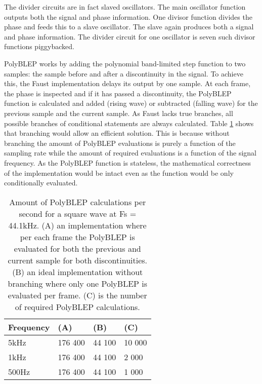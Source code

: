 \documentclass[11pt,a4paper]{article}
\begin{document}
The divider circuits are in fact slaved oscillators. The main oscillator function outputs both the signal and phase information. One divisor function divides the phase and feeds this to a slave oscillator. The slave again produces both a signal and phase information. The divider circuit for one oscillator is seven such divisor functions piggybacked.

PolyBLEP works by adding the polynomial band-limited step function to two samples: the sample before and after a discontinuity in the signal. To achieve this, the Faust implementation delays its output by one sample. At each frame, the phase is inspected and if it has passed a discontinuity, the PolyBLEP function is calculated and added (rising wave) or subtracted (falling wave) for the previous sample and the current sample. As Faust lacks true branches, all possible branches of conditional statements are always calculated. Table \ref{table:polyblep-amount} shows that branching would allow an efficient solution. This is because without branching the amount of PolyBLEP evaluations is purely a function of the sampling rate while the amount of required evaluations is a function of the signal frequency. As the PolyBLEP function is stateless, the mathematical correctness of the implementation would be intact even as the function would be only conditionally evaluated.

\begin{table}[h]
 \begin{center}
\begin{tabular}{|l|l|l|l|}

      \hline
      Frequency & (A)        &  (B)         & (C) \\
      \hline\hline
      5kHz     & 176 400     & 44 100       & 10 000\\
      1kHz     & 176 400     & 44 100       &  2 000\\
      500Hz    & 176 400     & 44 100       &  1 000\\
      \hline

\end{tabular}
\caption{Amount of PolyBLEP calculations per second for a square wave at Fs = 44.1kHz. 
(A) an implementation where per each frame the PolyBLEP is evaluated for both the previous and current sample for both discontinuities.
(B) an ideal implementation without branching where only one PolyBLEP is evaluated per frame.
(C) is the number of required PolyBLEP calculations.  }\label{table:polyblep-amount}
 \end{center}
\end{table}
\end{document}
